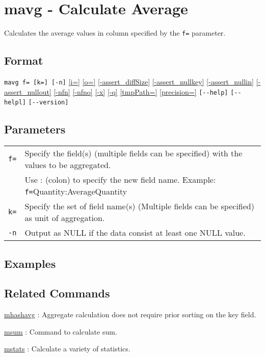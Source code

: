 
%
\section{mavg - Calculate Average\label{sect:mavg}}
Calculates the average values in column specified by the \verb|f=| parameter. 

\subsection*{Format}
\verb|mavg f= [k=] [-n]|
\hyperref[sect:option_i]{[i=]}
\hyperref[sect:option_o]{[o=]}
\hyperref[sect:option_assert_diffSize]{[-assert\_diffSize]}
\hyperref[sect:option_assert_nullkey]{[-assert\_nullkey]}
\hyperref[sect:option_assert_nullin]{[-assert\_nullin]}
\hyperref[sect:option_assert_nullout]{[-assert\_nullout]}
\hyperref[sect:option_nfn]{[-nfn]} 
\hyperref[sect:option_nfno]{[-nfno]}  
\hyperref[sect:option_x]{[-x]}
\hyperref[sect:option_q]{[-q]}
\hyperref[sect:option_option_tmppath]{[tmpPath=]}
\hyperref[sect:option_precision]{[precision=]}
\verb|[--help]|
\verb|[--helpl]|
\verb|[--version]|\\

\subsection*{Parameters}
\begin{table}[htbp]
{\small
\begin{tabular}{ll}
\verb|f=|    & Specify the field(s) (multiple fields can be specified) with the values to be aggregated.\\
             & Use : (colon) to specify the new field name. Example: \verb|f=|Quantity:AverageQuantity\\
\verb|k=|    & Specify the set of field name(s) (Multiple fields can be specified) as unit of aggregation. \\
\verb|-n|    & Output as NULL if the data consist at least one NULL value. \\
\end{tabular} 
}
\end{table} 


\subsection*{Examples}

\subsection*{Related Commands}

\hyperref[sect:mhashavg]{mhashavg} : Aggregate calculation does not require prior sorting on the key field.

\hyperref[sect:msum]{msum} : Command to calculate sum. 

\hyperref[sect:mstats]{mstats} : Calculate a variety of statistics. 

%

